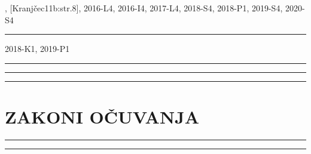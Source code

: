 \documentclass[10pt]{book}
\newcounter{zadatak} %
\newcounter{cjelina}
\begin{document}
 , [Kranjčec11b:str.8], 2016-L4, 2016-I4, 2017-L4, 2018-S4, 2018-P1, 2019-S4, 2020-S4

\vspace{0.2cm}

{\color{boja} \rule{\linewidth}{0.3mm} }



 2018-K1, 2019-P1

\vspace{0.2cm}

{\color{boja} \rule{\linewidth}{0.3mm} }




\vspace{0.2cm}


{\color{boja} \rule{\linewidth}{0.3mm} }




\vspace{0.2cm}


{\color{boja} \rule{\linewidth}{0.3mm} }




\vspace{0.2cm}

\vspace{0.2cm}



\newpage
\chapter{ZAKONI OČUVANJA}
\setcounter{zadatak}{0}




{\color{boja} \rule{\linewidth}{0.3mm} }

\vspace{0.2cm} 




{\color{boja} \rule{\linewidth}{0.3mm} }

\vspace{0.2cm}
\end{document}
